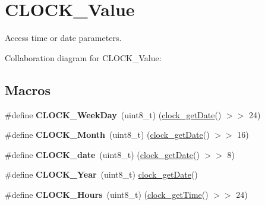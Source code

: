 \hypertarget{group___c_l_o_c_k___value}{}\section{C\+L\+O\+C\+K\+\_\+\+Value}
\label{group___c_l_o_c_k___value}


Access time or date parameters.  


Collaboration diagram for C\+L\+O\+C\+K\+\_\+\+Value\+:
\subsection*{Macros}
\begin{DoxyCompactItemize}
\item 
\mbox{\label{group___c_l_o_c_k___value_ga41cab09c59fe3cc9a25719ec3be3fd4d}} 
\#define {\bfseries C\+L\+O\+C\+K\+\_\+\+Week\+Day}~(uint8\+\_\+t) (\hyperlink{group___clock___time___date_gabb4d72928cb3d131d40067fb141003aa}{clock\+\_\+get\+Date}() $>$$>$ 24)
\item 
\mbox{\label{group___c_l_o_c_k___value_gabd717170aa836b16355413e2c5ca0ad8}} 
\#define {\bfseries C\+L\+O\+C\+K\+\_\+\+Month}~(uint8\+\_\+t) (\hyperlink{group___clock___time___date_gabb4d72928cb3d131d40067fb141003aa}{clock\+\_\+get\+Date}() $>$$>$ 16)
\item 
\mbox{\label{group___c_l_o_c_k___value_gaad5816af032bcc19c84bc93e03f42236}} 
\#define {\bfseries C\+L\+O\+C\+K\+\_\+date}~(uint8\+\_\+t) (\hyperlink{group___clock___time___date_gabb4d72928cb3d131d40067fb141003aa}{clock\+\_\+get\+Date}() $>$$>$ 8)
\item 
\mbox{\label{group___c_l_o_c_k___value_ga35866274a21e8d3c0223c465209f3d74}} 
\#define {\bfseries C\+L\+O\+C\+K\+\_\+\+Year}~(uint8\+\_\+t) \hyperlink{group___clock___time___date_gabb4d72928cb3d131d40067fb141003aa}{clock\+\_\+get\+Date}()
\item 
\mbox{\label{group___c_l_o_c_k___value_ga49ea807900604714bab70a531081ac6a}} 
\#define {\bfseries C\+L\+O\+C\+K\+\_\+\+Hours}~(uint8\+\_\+t) (\hyperlink{group___clock___time___date_ga03ae6948083c259f6edc0b146f40dc62}{clock\+\_\+get\+Time}() $>$$>$ 24)

\end{DoxyCompactItemize}
